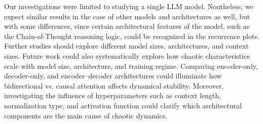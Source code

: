 \documentclass[a4paper,12pt]{article}
\begin{document}
Our investigations were limited to studying a single LLM model. Nontheless, we expect similar results in the case of other models and architectures as well, but with some differences, since certain architectural features of the model, such as the Chain-of-Thought reasoning logic, could be recognized in the recurrence plots. Further studies should explore different model sizes, architectures, and context sizes.
Future work could also systematically explore how chaotic characteristics scale with model size, architecture, and training regime. Comparing encoder-only, decoder-only, and encoder–decoder architectures could illuminate how bidirectional vs. causal attention affects dynamical stability. Moreover, investigating the influence of hyperparameters such as context length, normalization type, and activation function could clarify which architectural components are the main cause of chaotic dynamics.





\end{document}
